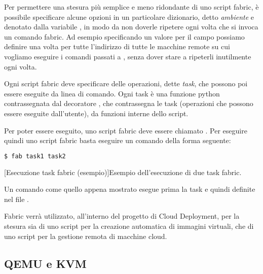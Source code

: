             Per permettere una stesura più semplice e meno ridondante di uno script fabric, è possibile specificare alcune opzioni in un particolare dizionario, detto \textit{ambiente} e denotato dalla variabile , in modo da non doverle ripetere ogni volta che si invoca un comando fabric. Ad esempio specificando un valore per il campo  possiamo definire una volta per tutte l'indirizzo di tutte le macchine remote su cui vogliamo eseguire i comandi passati a , senza dover stare a ripeterli inutilmente ogni volta.
            
            Ogni script fabric deve specificare delle operazioni, dette \textit{task}, che possono poi essere eseguite da linea di comando. Ogni task è una funzione python contrassegnata dal decoratore , che contrassegna le task (operazioni che possono essere eseguite dall'utente), da funzioni interne dello script.
            
            Per poter essere eseguito, uno script fabric deve essere chiamato . Per eseguire quindi uno script fabric basta eseguire un comando della forma seguente:
            
            \begin{center}
                \begin{lstlisting}[language=bash, gobble=18]
                    $ fab task1 task2
                \end{lstlisting}
                \captionsetup{textformat=empty,labelformat=empty} \vspace{-2em}
                [Esecuzione task fabric (esempio)]{Esempio dell'esecuzione di due task fabric.}
            \end{center}
            
            Un comando come quello appena mostrato esegue prima la task  e quindi  definite nel file .
            
            Fabric verrà utilizzato, all'interno del progetto di Cloud Deployment, per la stesura sia di uno script per la creazione automatica di immagini virtuali, che di uno script per la gestione remota di macchine cloud.
        
        \subsection{QEMU e KVM} \label{subsec:p;sl;qemu_kvm}
        
